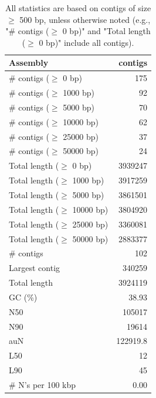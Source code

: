 \documentclass[12pt,a4paper]{article}
\begin{document}
\begin{table}[ht]
\begin{center}
\caption{All statistics are based on contigs of size $\geq$ 500 bp, unless otherwise noted (e.g., "\# contigs ($\geq$ 0 bp)" and "Total length ($\geq$ 0 bp)" include all contigs).}
\begin{tabular}{|l*{1}{|r}|}
\hline
Assembly & contigs \\ \hline
\# contigs ($\geq$ 0 bp) & 175 \\ \hline
\# contigs ($\geq$ 1000 bp) & 92 \\ \hline
\# contigs ($\geq$ 5000 bp) & 70 \\ \hline
\# contigs ($\geq$ 10000 bp) & 62 \\ \hline
\# contigs ($\geq$ 25000 bp) & 37 \\ \hline
\# contigs ($\geq$ 50000 bp) & 24 \\ \hline
Total length ($\geq$ 0 bp) & 3939247 \\ \hline
Total length ($\geq$ 1000 bp) & 3917259 \\ \hline
Total length ($\geq$ 5000 bp) & 3861501 \\ \hline
Total length ($\geq$ 10000 bp) & 3804920 \\ \hline
Total length ($\geq$ 25000 bp) & 3360081 \\ \hline
Total length ($\geq$ 50000 bp) & 2883377 \\ \hline
\# contigs & 102 \\ \hline
Largest contig & 340259 \\ \hline
Total length & 3924119 \\ \hline
GC (\%) & 38.93 \\ \hline
N50 & 105017 \\ \hline
N90 & 19614 \\ \hline
auN & 122919.8 \\ \hline
L50 & 12 \\ \hline
L90 & 45 \\ \hline
\# N's per 100 kbp & 0.00 \\ \hline
\end{tabular}
\end{center}
\end{table}
\end{document}
